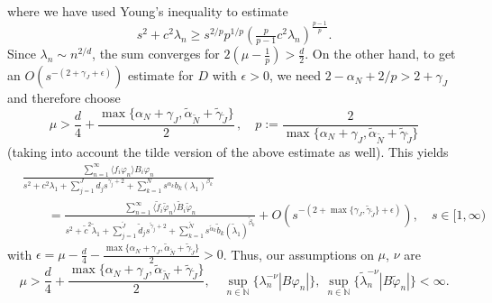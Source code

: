 where we have used Young's inequality to estimate
\[
s^2+c^2\lambda_n \geq 
s^{2/p}p^{1/p}(\tfrac{p}{p-1}c^2\lambda_n)^{\frac{p-1}{p}}.
\]
Since $\lambda_n \sim n^{2/d}$, the sum converges for $2(\mu-\frac{1}{p})>\frac{d}{2}$. 
On the other hand, to get an $O(s^{-(2+\gamma_J+\epsilon)}) $ estimate for $D$ with $\epsilon>0$, we need $2-\alpha_N+2/p>2+\gamma_J$ and therefore choose
\begin{equation}\label{eqn:mu}
\mu>\frac{d}{4}+\frac{\max\{\alpha_N+\gamma_J,\tilde{\alpha}_{\tilde{N}}+\tilde{\gamma}_{\tilde{J}}\}}{2}\,, \quad p:= \frac{2}{\max\{\alpha_N+\gamma_J,\tilde{\alpha}_{\tilde{N}}+\tilde{\gamma}_{\tilde{J}}\}}
\end{equation} 
(taking into account the tilde version of the above estimate as well).
This yields
\[
\begin{aligned}
&\frac{\sum_{n=1}^\infty\langle f_{i}\varphi_n\rangle B_i\varphi_n}{
s^2+c^2\lambda_1+\sum_{j=1}^J d_j s^{\gamma_j+2}+\sum_{k=1}^{N} s^{\alpha_k} b_{k}(\lambda_1)^{\beta_{k}}}\\
&\qquad=
\frac{\sum_{n=1}^\infty\langle \tilde{f}_{i}\tilde{\varphi}_n\rangle \tilde{B}_i\tilde{\varphi}_n}{
s^2+\tilde{c}^2\tilde{\lambda}_1+\sum_{j=1}^{\tilde{J}} \tilde{d}_j s^{\tilde{\gamma}_j+2}+\sum_{k=1}^{\tilde{N}} s^{\tilde{\alpha}_k} \tilde{b}_{k}(\tilde{\lambda}_1)^{\tilde{\beta}_{k}}}
+O(s^{-(2+\max\{\gamma_J,\tilde{\gamma}_{\tilde{J}}\}+\epsilon)}), \quad s\in[1,\infty) 
\end{aligned}
\]
with $\epsilon = \mu-\frac{d}{4}-\frac{\max\{\alpha_N+\gamma_J,\tilde{\alpha}_{\tilde{N}}+\tilde{\gamma}_{\tilde{J}}\}}{2}>0$. 
Thus, our assumptions on $\mu$, $\nu$ are 
\begin{equation}\label{eqn:munu}
\mu>\frac{d}{4}+\frac{\max\{\alpha_N+\gamma_J,\tilde{\alpha}_{\tilde{N}}+\tilde{\gamma}_{\tilde{J}}\}}{2},
\quad
\sup_{n\in\mathbb{N}} \{\lambda_n^{-\nu}|B\varphi_n|\}, \ \sup_{n\in\mathbb{N}} \{\tilde{\lambda}_n^{-\nu}|B\tilde{\varphi}_n|\} <\infty.
\end{equation}

